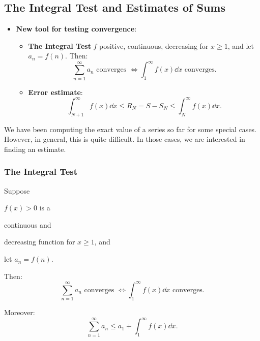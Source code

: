 \subsection{The Integral Test and Estimates of Sums} 
\begin{center}
\begin{tcolorbox}
    \begin{itemize}
        \item \textbf{New tool for testing convergence}: 
        \begin{itemize}
            \item \textbf{The Integral Test}
            $f$ positive, continuous, decreasing for $x \geq 1$, and let $a_n = f(n)$. Then:
            \[\sum_{n=1}^\infty a_n \text{ converges } \iff \int_1^\infty f(x) \dd x \text{ converges.}\]
            
            \item \textbf{Error estimate}:
            \[\int_{N+1}^\infty f(x) \dd x \leq R_N = S - S_N \leq \int_{N}^\infty f(x) \dd x.\]
        \end{itemize}
    \end{itemize}
\end{tcolorbox}
\end{center}

We have been computing the exact value of a series so far for some special cases. However, in general, this is quite difficult. In those cases, we are interested in finding an estimate.

\subsubsection{The Integral Test}
\begin{thm}
    Suppose \begin{enumerate*}[label = \circled{\arabic*}]
        \item $f(x) > 0$ is a  \item continuous and \item decreasing function for $x \geq 1$, and 
        \item let $a_n = f(n)$. 
    \end{enumerate*} Then:
    \[\sum_{n=1}^\infty a_n \text{ converges } \iff \int_1^\infty f(x) \dd x \text{ converges.}\]
    
    Moreover:
    \[ \sum_{n=1}^\infty a_n \leq a_1 + \int_1^\infty f(x) \dd x.\]
\end{thm}

